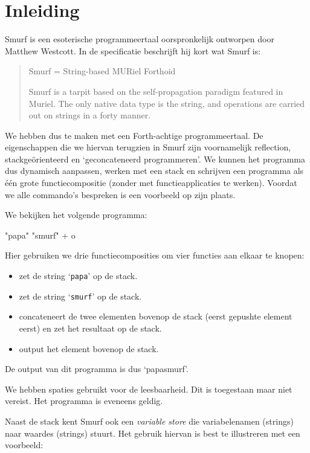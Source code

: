 \section{Inleiding}
\label{sec:intro}

Smurf is een esoterische programmeertaal oorspronkelijk ontworpen door Matthew
Westcott. In de specificatie \cite{safalra} beschrijft hij kort wat Smurf is:
\begin{quote}
	Smurf = String-based MURiel Forthoid

	Smurf is a tarpit based on the self-propagation paradigm featured in Muriel.
	The only native data type is the string, and operations are carried out on
	strings in a forty manner.
\end{quote}
We hebben dus te maken met een Forth-achtige programmeertaal. De eigenschappen
die we hiervan terugzien in Smurf zijn voornamelijk reflection,
stackgeörienteerd en `geconcateneerd programmeren'. We kunnen het programma dus
dynamisch aanpassen, werken met een stack en schrijven een programma als één
grote functiecompositie (zonder met functieapplicaties te werken). Voordat we
alle commando's bespreken is een voorbeeld op zijn plaats.

\begin{exmp}
	We bekijken het volgende programma:
	\begin{smurf}"papa" "smurf" + o\end{smurf}
	Hier gebruiken we drie functiecomposities om vier functies aan elkaar te
	knopen:
	\begin{itemize}
		\item {} zet de string `\texttt{papa}' op de stack.
		\item {} zet de string `\texttt{smurf}' op de stack.
		\item \smurfinline{+} concateneert de twee elementen bovenop de stack
			(eerst gepushte element eerst) en zet het resultaat op de stack.
		\item {} output het element bovenop de stack.
	\end{itemize}
	De output van dit programma is dus `papasmurf'.

	We hebben spaties gebruikt voor de leesbaarheid. Dit is toegestaan maar niet
	vereist. Het programma  is eveneens geldig.
\end{exmp}

Naast de stack kent Smurf ook een \emph{variable store} die variabelenamen
(strings) naar waardes (strings) stuurt. Het gebruik hiervan is best te
illustreren met een voorbeeld:

